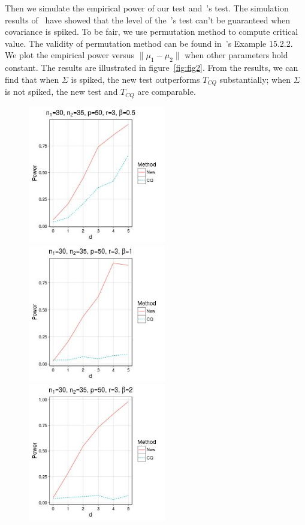 \documentclass[review]{elsarticle}
\theoremstyle{plain}
\theoremstyle{definition}
\theoremstyle{remark}
\begin{document}
Then we simulate the empirical power of our test and~\cite{Chen2010A}'s test. The simulation results of~\cite{Ma2015A} have showed that the level of the~\cite{Chen2010A}'s test can't be guaranteed when covariance is spiked. To be fair, we use permutation method to compute critical value. The validity of permutation method can be found in~\cite{Lehmann}'s Example 15.2.2. We plot the empirical power versus $\|\mu_1-\mu_2\|$ when other parameters hold constant. The results are illustrated in figure~\ref{fig:fig2}.
From the results, we can find that when $\Sigma$ is spiked, the new test outperforms $T_{CQ}$ substantially; when $\Sigma$ is not spiked, the new test and $T_{CQ}$ are comparable.
\begin{figure}
    \centering 
    \includegraphics[height=6cm]{code/fig1.jpeg}
    \includegraphics[height=6cm]{code/fig2.jpeg}
    \\
    \includegraphics[height=6cm]{code/fig3.jpeg}

\end{figure}
\end{document}
